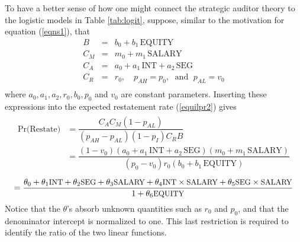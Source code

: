 \documentclass[12pt,reqno,titlepage]{amsart}
\theoremstyle{definition}
\begin{document}
\begin{doublespace}
To have a better sense of how one might connect the strategic auditor theory to the
logistic models in Table \ref{tab:logit}, suppose, similar to the motivation for equation (\ref{eqns1}), that 
\begin{equation}\begin{array}{lcl}\label{eqns2}
B & = & b_0 + b_1 \, \mbox{EQUITY} \\[.5em]
C_M & = & m_0 + m_1 \, \mbox{SALARY} \\[.5em]
C_A & = & a_0 + a_1 \, \mbox{INT} + a_2 \, \mbox{SEG}\\[.5em]
C_R & = & r_0, \quad p_{AH}   =  p_0, \; \mbox{ and } \; p_{AL}  =  v_0 \\[.5em]
\end{array}
\end{equation}
where $ a_0, a_1, a_2, r_0, b_0, p_0$ and $v_0$ are constant parameters. 
Inserting these expressions into the expected restatement rate (\ref{equilpr2}) gives
\begin{align}
\begin{split} 
\mbox{Pr(Restate)} & =   \dfrac{C_AC_M(1-p_{AL})}{(p_{AH}-p_{AL})(1-p_I)C_RB} \\
&= \dfrac{(1-v_0)(a_0 + a_1 \, \mbox{INT} + a_2 \, \mbox{SEG})(m_0 + m_1 \, \mbox{SALARY})}
{(p_0-v_0)r_0(b_0 + b_1 \, \mbox{EQUITY})} \label{equilpr3}
\end{split}
\end{align}
\begin{equation}\label{equilpr4}
 =  \dfrac{\theta_0 + \theta_1\mbox{\small INT} + \theta_2\mbox{\small SEG} + \theta_3\mbox{\small SALARY}
+ \theta_4\mbox{\small INT} \times \mbox{\small SALARY}+ \theta_5\mbox{\small SEG} \times \mbox{\small SALARY}}
{1 +  \theta_6\mbox{\small EQUITY}}
\end{equation}
Notice that the $\theta$'s absorb unknown quantities such as $r_0$ and $p_0$, and that the denominator intercept
is normalized to one. This last restriction is required to identify the ratio of the two linear functions.


\end{doublespace}
\end{document}
